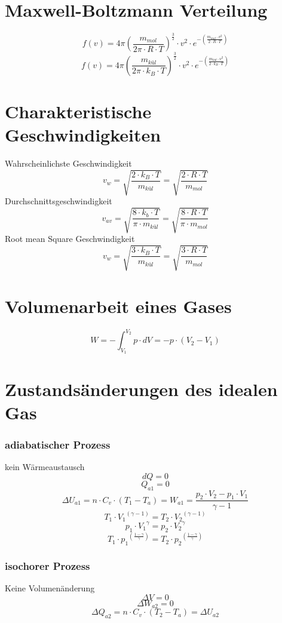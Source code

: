 \section{Maxwell-Boltzmann Verteilung}
\[ \boxed{f(v) = 4 \pi \left(\frac{m_{mol}}{2 \pi \cdot R \cdot T}\right)^{\frac{3}{2}}
\cdot v^2 \cdot e^{-\left(\frac{m_{mol} \cdot v^2}{2 \cdot R \cdot T}\right)}} \]
\[ \boxed{f(v) = 4 \pi \left(\frac{m_{kül}}{2 \pi \cdot k_B \cdot T}\right)^{\frac{3}{2}}
\cdot v^2 \cdot e^{-\left(\frac{m_{kül} \cdot v^2}{2 \cdot k_B \cdot T}\right)}} \]

\section{Charakteristische Geschwindigkeiten}
Wahrscheinlichste Geschwindigkeit
\[ \boxed{v_w = \sqrt{\frac{2 \cdot k_B \cdot T}{m_{kül}}} 
= \sqrt{\frac{2 \cdot R \cdot T}{m_{mol}}}} \]
Durchschnittsgeschwindigkeit
\[ \boxed{v_{av} = \sqrt{\frac{8 \cdot k_b \cdot T}{\pi \cdot m_{kül}}} 
= \sqrt{\frac{8 \cdot R \cdot T}{\pi \cdot m_{mol}}}} \]
Root mean Square Geschwindigkeit
\[ \boxed{v_w = \sqrt{\frac{3 \cdot k_B \cdot T}{m_{kül}}} 
= \sqrt{\frac{3 \cdot R \cdot T}{m_{mol}}}} \]

\section{Volumenarbeit eines Gases}
\[ \boxed{W = -\int_{V_1}^{V_2} p \cdot dV = - p \cdot (V_2 - V_1)} \]

\section{Zustandsänderungen des idealen Gas}

\subsubsection{adiabatischer Prozess}
kein Wärmeaustausch
\[ d Q = 0 \]
\[ Q_{a1} = 0 \]
\[ \Delta U_{a1} = n \cdot C_v \cdot (T_1 - T_a) = W_{a1} 
= \frac{p_2 \cdot V_2 - p_1 \cdot V_1}{\gamma - 1} \]
\[ T_1 \cdot {V_1}^{(\gamma - 1)} = T_2 \cdot {V_2}^{(\gamma - 1)} \]
\[ p_1 \cdot {V_1}^{\gamma} = p_2 \cdot {V_2}^{\gamma} \]
\[ T_1 \cdot {p_1}^{\left(\frac{1 - \gamma}{\gamma}\right)} 
= T_2 \cdot {p_2}^{\left(\frac{1 - \gamma}{\gamma}\right)} \]

\subsubsection{isochorer Prozess}
Keine Volumenänderung
\[ \Delta V = 0 \]
\[ \Delta W_{a2} = 0 \]
\[ \Delta Q_{a2} = n \cdot C_v \cdot (T_2 - T_a) = \Delta U_{a2} \]


